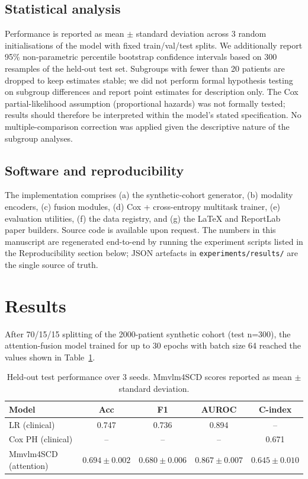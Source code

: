 \documentclass[11pt,a4paper]{article}
\begin{document}
\subsection{Statistical analysis}
Performance is reported as mean $\pm$ standard deviation across 3 random initialisations of the model with fixed train/val/test splits. We additionally report 95\% non-parametric percentile bootstrap confidence intervals based on 300 resamples of the held-out test set. Subgroups with fewer than 20 patients are dropped to keep estimates stable; we did not perform formal hypothesis testing on subgroup differences and report point estimates for description only. The Cox partial-likelihood assumption (proportional hazards) was not formally tested; results should therefore be interpreted within the model's stated specification. No multiple-comparison correction was applied given the descriptive nature of the subgroup analyses.
\subsection{Software and reproducibility}
The implementation comprises (a) the synthetic-cohort generator, (b) modality encoders, (c) fusion modules, (d) Cox + cross-entropy multitask trainer, (e) evaluation utilities, (f) the data registry, and (g) the LaTeX and ReportLab paper builders. Source code is available upon request. The numbers in this manuscript are regenerated end-to-end by running the experiment scripts listed in the Reproducibility section below; JSON artefacts in \texttt{experiments/results/} are the single source of truth.
\FloatBarrier
\section{Results}
After 70/15/15 splitting of the 2000-patient synthetic cohort (test n=300), the attention-fusion model trained for up to 30 epochs with batch size 64 reached the values shown in Table~\ref{tab:main}.
\begin{table}[htbp]\centering
\caption{Held-out test performance over 3 seeds. Mmvlm4SCD scores reported as mean $\pm$ standard deviation.}\label{tab:main}
\small
\begin{tabular}{lcccc}
\toprule
Model & Acc & F1 & AUROC & C-index \\
\midrule
LR (clinical) & 0.747 & 0.736 & 0.894 & -- \\
Cox PH (clinical) & -- & -- & -- & 0.671 \\
Mmvlm4SCD (attention) & $0.694 \pm 0.002$ & $0.680 \pm 0.006$ & $0.867 \pm 0.007$ & $0.645 \pm 0.010$ \\
\bottomrule\end{tabular}\end{table}
\end{document}
